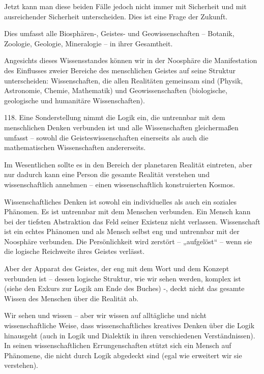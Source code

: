 \documentclass[11pt,a4paper]{book}
\begin{document}
Jetzt kann man diese beiden Fälle jedoch nicht immer mit Sicherheit und mit ausreichender Sicherheit unterscheiden. Dies ist eine Frage der Zukunft.



Dies umfasst alle Biosphären-, Geistes- und Geowissenschaften -- Botanik, Zoologie, Geologie, Mineralogie -- in ihrer Gesamtheit.



Angesichts dieses Wissensstandes können wir in der Noosphäre die Manifestation des Einflusses zweier Bereiche des menschlichen Geistes auf seine Struktur unterscheiden: Wissenschaften, die allen Realitäten gemeinsam sind (Physik, Astronomie, Chemie, Mathematik) und Geowissenschaften (biologische, geologische und humanitäre Wissenschaften).



118. Eine Sonderstellung nimmt die Logik ein, die untrennbar mit dem menschlichen Denken verbunden ist und alle Wissenschaften gleichermaßen umfasst -- sowohl die Geisteswissenschaften einerseits als auch die mathematischen Wissenschaften andererseits.



Im Wesentlichen sollte es in den Bereich der planetaren Realität eintreten, aber nur dadurch kann eine Person die gesamte Realität verstehen und wissenschaftlich annehmen -- einen wissenschaftlich konstruierten Kosmos.



Wissenschaftliches Denken ist sowohl ein individuelles als auch ein soziales Phänomen. Es ist untrennbar mit dem Menschen verbunden. Ein Mensch kann bei der tiefsten Abstraktion das Feld seiner Existenz nicht verlassen. Wissenschaft ist ein echtes Phänomen und als Mensch selbst eng und untrennbar mit der Noosphäre verbunden. Die Persönlichkeit wird zerstört -- „aufgelöst“ -- wenn sie die logische Reichweite ihres Geistes verlässt.



Aber der Apparat des Geistes, der eng mit dem Wort und dem Konzept verbunden ist -- dessen logische Struktur, wie wir sehen werden, komplex ist (siehe den Exkurs zur Logik am Ende des Buches) -, deckt nicht das gesamte Wissen des Menschen über die Realität ab.



Wir sehen und wissen -- aber wir wissen auf alltägliche und nicht wissenschaftliche Weise, dass wissenschaftliches kreatives Denken über die Logik hinausgeht (auch in Logik und Dialektik in ihren verschiedenen Verständnissen). In seinen wissenschaftlichen Errungenschaften stützt sich ein Mensch auf Phänomene, die nicht durch Logik abgedeckt sind (egal wie erweitert wir sie verstehen).
\end{document}
